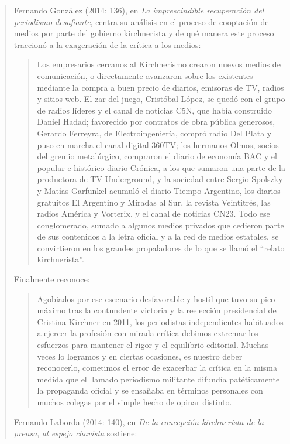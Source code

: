 \begin{quote}
Fernando González (2014: 136), en \emph{La imprescindible recuperación del periodismo desafiante}, centra su análisis en el proceso de cooptación de medios por parte del gobierno kirchnerista y de qué manera este proceso traccionó a la exageración de la crítica a los medios:

\begin{quote}
	Los empresarios cercanos al Kirchnerismo crearon nuevos medios de comunicación, o directamente avanzaron sobre los existentes mediante la compra a buen precio de diarios, emisoras de TV, radios y sitios web. El zar del juego, Cristóbal López, se quedó con el grupo de radios líderes y el canal de noticias C5N, que había construido Daniel Hadad; favorecido por contratos de obra pública generosos, Gerardo Ferreyra, de Electroingeniería, compró radio Del Plata y puso en marcha el canal digital 360TV; los hermanos Olmos, socios del gremio metalúrgico, compraron el diario de economía BAC y el popular e histórico diario Crónica, a los que sumaron una parte de la productora de TV Underground, y la sociedad entre Sergio Spolszky y Matías Garfunkel acumuló el diario Tiempo Argentino, los diarios gratuitos El Argentino y Miradas al Sur, la revista Veintitrés, las radios América y Vorterix, y el canal de noticias CN23. Todo ese conglomerado, sumado a algunos medios privados que cedieron parte de sus contenidos a la letra oficial y a la red de medios estatales, se convirtieron en los grandes propaladores de lo que se llamó el \enquote{relato kirchnerista}.
\end{quote}


Finalmente reconoce:

\begin{quote}
	Agobiados por ese escenario desfavorable y hostil que tuvo su pico máximo tras la contundente victoria y la reelección presidencial de Cristina Kirchner en 2011, los periodistas independientes habituados a ejercer la profesión con mirada crítica debimos extremar los esfuerzos para mantener el rigor y el equilibrio editorial. Muchas veces lo logramos y en ciertas ocasiones, es nuestro deber reconocerlo, cometimos el error de exacerbar la crítica en la misma medida que el llamado periodismo militante difundía patéticamente la propaganda oficial y se ensañaba en términos personales con muchos colegas por el simple hecho de opinar distinto.
\end{quote}


Fernando Laborda (2014: 140), en \emph{De la concepción kirchnerista de la prensa}, \emph{al espejo chavista }sostiene:


\end{quote}
